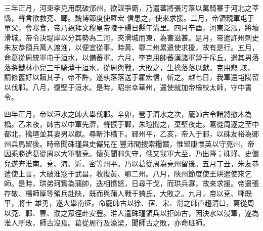 \begin{pinyinscope}
 三年正月，河東李克用既破邠州，欲謀爭霸，乃遣蕃將張污落以萬騎寨于河北之莘縣，聲言欲救兗、鄆。魏博節度使羅宏
 信患之，使來求援。二月，帝領親軍屯于單父，會寒食，帝乃親拜文穆皇帝陵于碭日縣午溝里。四月辛酉，河東泛漲，將壞滑城。帝令決堤岸以分其勢為二河，夾滑城而東，為害滋甚。是月，帝遣許州刺史朱友恭領兵萬人渡淮，以便宜從事。時黃、鄂二州累遣使求援，故有是行。五月，命葛從周統軍屯于洹水，以備蕃軍。六月，李克用帥蕃漢諸軍營于斥丘，遣其男落落將鐵林小兒三千騎薄于洹水，從周與戰，大敗之，生擒落落以獻。克用悲
 駭，請修舊好以贖其子，帝不許，遂執落落送于羅宏信，斬之。越七日，我軍還屯陽留以伐鄆。八月，復壁于洹水。是時，昭宗幸華州，遣使就加帝檢校太師，守中書令。



 四年正月，帝以洹水之師大舉伐鄆。辛卯，營于濟水之次，龐師古令諸將撤木為橋。乙未夜，師古以中軍先濟，聲振于鄆，朱瑄聞之，棄壁夜走。葛從周逐之至中都北，擒瑄並其妻男以獻。尋斬汴橋下。鄆州平，乙亥，帝入于鄆，以硃友裕為鄆州兵馬留後。時帝聞硃瑾與史儼兒在
 豐沛間搜索糧饋，惟留康懷英以守兗州，帝因乘勝遣葛從周以大軍襲兗。懷英聞鄆失守，俄又我軍大至，乃出降；硃瑾、史儼兒遂奔淮南。兗、海、沂、密等州平。乃以葛從周為兗州留後。五月丁丑，朱友恭遣使上言，大破淮寇于武昌，收復黃、鄂二州。八月，陜州節度使王珙遣使來乞師。是時，珙弟珂實為蒲帥，迭相憤怒，日尋干戈，而珙兵寡，故來求援。帝遣張存敬、楊師厚等領兵赴陜，既而與蒲人戰于猗氏，大敗之。九月，帝以兗、鄆既平，將士
 雄勇，遂大舉南征。命龐師古以徐、宿、宋、滑之師直趨清口，葛從周以兗、鄆、曹、濮之眾徑赴安豐。淮人遣硃瑾領兵以拒師古，因決水以浸軍，遂為淮人所敗，師古沒焉。葛從周行及濠梁，聞師古之敗，亦命班師。



\end{pinyinscope}